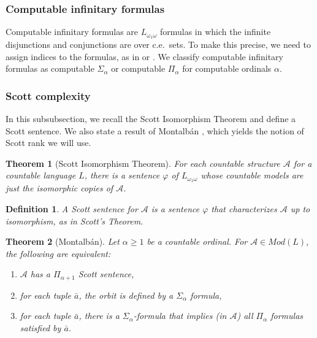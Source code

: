 \documentclass{article}
\newtheorem{thm}{Theorem}[section]
\newtheorem{defn}{Definition}
\begin{document}
\subsubsection{Computable infinitary formulas}

Computable infinitary formulas are $L_{\omega_1\omega}$ formulas in which the infinite disjunctions and conjunctions are over c.e.\ sets.  To make this precise, we need to assign indices to the formulas, as in \cite{AKbook} or \cite{Mbook2}.  We classify computable infinitary formulas as computable $\Sigma_\alpha$ or computable $\Pi_\alpha$ for computable ordinals $\alpha$.   

\subsubsection{Scott complexity}

In this subsubsection, we recall the Scott Isomorphism Theorem \cite{S} and define a Scott sentence.  We also state a result of Montalb\'{a}n \cite{robuster}, which yields the notion of Scott rank we will use.   

\begin{thm} [Scott Isomorphism Theorem]

For each countable structure $\mathcal{A}$ for a countable language $L$, there is a sentence $\varphi$ of $L_{\omega_1\omega}$ whose countable models are just the isomorphic copies of $\mathcal{A}$.

\end{thm}

\begin{defn}
    
A \emph{Scott sentence} for $\mathcal{A}$ is a sentence $\varphi$ that characterizes $\mathcal{A}$ up to isomorphism, as in Scott's Theorem. 

\end{defn}

\begin{thm} [Montalb\'{a}n]

Let $\alpha\geq 1$ be a countable ordinal.  For $\mathcal{A}\in Mod(L)$, the following are equivalent:

\begin{enumerate}

\item  $\mathcal{A}$ has a $\Pi_{\alpha+1}$ Scott sentence,

\item  for each tuple $\bar{a}$, the orbit is defined by a $\Sigma_\alpha$ formula,

\item  for each tuple $\bar{a}$, there is a $\Sigma_\alpha$-formula that implies (in $\mathcal{A}$) all $\Pi_\alpha$ formulas satisfied by $\bar{a}$.

\end{enumerate}

\end{thm}
\end{document}
